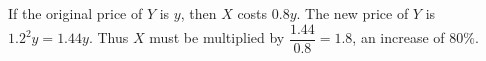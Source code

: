 If the original price of $Y$ is $y$, then $X$ costs $0.8y$. The new price of $Y$ is $1.2^2y=1.44y$. Thus $X$ must be multiplied by $\dfrac{1.44}{0.8}=1.8$, an increase of $\boxed{80\%}$.
